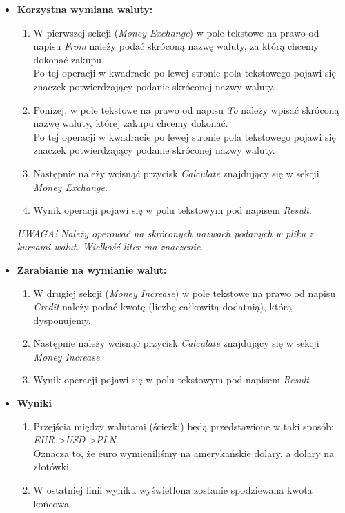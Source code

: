 \documentclass[a4paper,11pt]{article}
\begin{document}
\begin{itemize}
\item  \textbf{Korzystna wymiana waluty:}
\begin{enumerate}
\item W pierwszej sekcji (\textit{Money Exchange}) w pole tekstowe na prawo od napisu \textit{From} należy podać skróconą nazwę waluty, za którą chcemy dokonać zakupu.
\\ Po tej operacji w kwadracie po lewej stronie pola tekstowego pojawi się znaczek potwierdzający podanie skróconej nazwy waluty.
\item Poniżej, w pole tekstowe na prawo od napisu \textit{To} należy wpisać skróconą nazwę waluty, której zakupu chcemy dokonać.
\\ Po tej operacji w kwadracie po lewej stronie pola tekstowego pojawi się znaczek potwierdzający podanie skróconej nazwy waluty.
\item Następnie należy wcisnąć przycisk \textit{Calculate} znajdujący się w sekcji \textit{Money Exchange}.
\item Wynik operacji pojawi się w polu tekstowym pod napisem \textit{Result}.
\end{enumerate}
\textit{UWAGA! Należy operować na skróconych nazwach podanych w pliku z kursami walut. Wielkość liter ma znaczenie.}
\item  \textbf{Zarabianie na wymianie walut:}
\begin{enumerate}
\item W drugiej sekcji (\textit{Money Increase}) w pole tekstowe na prawo od napisu \textit{Credit} należy podać kwotę (liczbę całkowitą dodatnią), którą dysponujemy.
\item Następnie należy wcisnąć przycisk \textit{Calculate} znajdujący się w sekcji \textit{Money Increase}.
\item Wynik operacji pojawi się w polu tekstowym pod napisem \textit{Result}.
\end{enumerate}
\item\textbf{ Wyniki}
\begin{enumerate}
\item Przejścia między walutami (ścieżki) będą przedstawione w taki sposób: \emph{EUR->USD->PLN}.
\\Oznacza to, że euro wymieniliśmy na amerykańskie dolary, a dolary na złotówki.
\item W ostatniej linii wyniku wyświetlona zostanie spodziewana kwota końcowa.
\end{enumerate}
\end{itemize}
\end{document}
